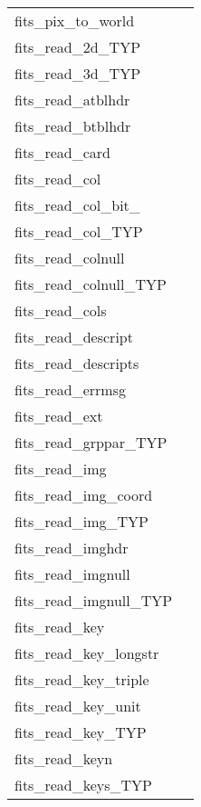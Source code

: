\documentclass[11pt]{book}
\begin{document}
\begin{tabular}{lr}
fits\_pix\_to\_world & \pageref{ffwldp} \\
fits\_read\_2d\_TYP      & \pageref{ffg2dx} \\
fits\_read\_3d\_TYP      & \pageref{ffg3dx} \\
fits\_read\_atblhdr      & \pageref{ffghtb} \\
fits\_read\_btblhdr      & \pageref{ffghbn} \\
fits\_read\_card         & \pageref{ffgcrd} \\
fits\_read\_col        & \pageref{ffgcv} \\
fits\_read\_col\_bit\_ & \pageref{ffgcx} \\
fits\_read\_col\_TYP    & \pageref{ffgcvx} \\
fits\_read\_colnull    & \pageref{ffgcf} \\
fits\_read\_colnull\_TYP    & \pageref{ffgcfx} \\
fits\_read\_cols        & \pageref{ffgcvn} \\
fits\_read\_descript & \pageref{ffgdes} \\
fits\_read\_descripts & \pageref{ffgdes} \\
fits\_read\_errmsg    & \pageref{ffgmsg} \\
fits\_read\_ext        & \pageref{ffgextn} \\
fits\_read\_grppar\_TYP  & \pageref{ffggpx} \\
fits\_read\_img         & \pageref{ffgpv} \\
fits\_read\_img\_coord & \pageref{ffgics} \\
fits\_read\_img\_TYP     & \pageref{ffgpvx} \\
fits\_read\_imghdr       & \pageref{ffghpr} \\
fits\_read\_imgnull & \pageref{ffgpf} \\
fits\_read\_imgnull\_TYP & \pageref{ffgpfx} \\
fits\_read\_key          & \pageref{ffgky} \\
fits\_read\_key\_longstr  & \pageref{ffgkls} \\
fits\_read\_key\_triple   & \pageref{ffgkyt} \\
fits\_read\_key\_unit     & \pageref{ffgunt} \\
fits\_read\_key\_TYP      & \pageref{ffgkyx} \\
fits\_read\_keyn         & \pageref{ffgkyn} \\
fits\_read\_keys\_TYP     & \pageref{ffgknx} \\

\end{tabular}
\end{document}
